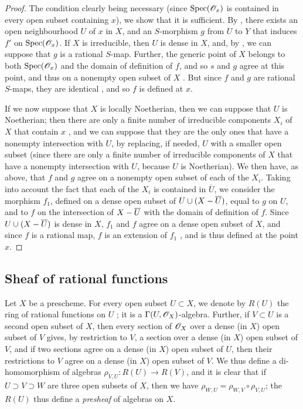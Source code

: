 \begin{proof}
\label{proof-1.7.2.9}
The condition clearly being necessary (since ${\mathop{\mathrm{Spec}}\nolimits}(\mathscr{O}_x)$ is contained in every open subset containing $x$), we show that it is sufficient.
By , there exists an open neighbourhood $U$ of $x$ in $X$, and an $S$-morphism $g$ from $U$ to $Y$ that induces $f'$ on ${\mathop{\mathrm{Spec}}\nolimits}(\mathscr{O}_x)$.
If $X$ is irreducible, then $U$ is dense in $X$, and, by , we can suppose that $g$ is a rational $S$-map.
Further, the generic point of $X$ belongs to both ${\mathop{\mathrm{Spec}}\nolimits}(\mathscr{O}_x)$ and the domain of definition of $f$, and so $s$ and $g$ agree at this point, and thus on a nonempty open subset of $X$ .
But since $f$ and $g$ are rational $S$-maps, they are identical , and so $f$ is defined at $x$.

If we now suppose that $X$ is locally Noetherian, then we can suppose that $U$ is Noetherian; then there are only a finite number of irreducible components $X_i$ of $X$ that contain $x$ , and we can suppose that they are the only ones that have a nonempty intersection with $U$, by replacing, if needed, $U$ with a smaller open subset (since there are only a finite number of irreducible components of $X$ that have a nonempty intersection with $U$, because $U$ is Noetherian).
We then have, as above, that $f$ and $g$ agree on a nonempty open subset of each of the $X_i$.
Taking into account the fact that each of the $X_i$ is contained in $\overline{U}$, we consider the morphism $f_1$, defined on a dense open subset of $U\cup(X-\overline{U})$, equal to $g$ on $U$, and to $f$ on the intersection of $X-\overline{U}$ with the domain of definition of $f$.
Since $U\cup(X-\overline{U})$ is dense in $X$, $f_1$ and $f$ agree on a dense open subset of $X$, and since $f$ is a rational map, $f$ is an extension of $f_1$ , and is thus defined at the point $x$.
\end{proof}

\subsection{Sheaf of rational functions}
\label{subsection:sheaf-of-rational-functions}

\begin{env}[7.3.1]
\label{1.7.3.1}
Let $X$ be a prescheme.
For every open subset $U\subset X$, we denote by $R(U)$ the ring of rational functions on $U$ ; it is a $\Gamma(U,\mathscr{O}_X)$-algebra.
Further, if $V\subset U$ is a second open subset of $X$, then every section of $\mathscr{O}_X$ over a dense (in $X$) open subset of $V$ gives, by restriction to $V$, a section over a dense (in $X$) open subset of $V$, and if two sections agree on a dense (in $X$) open subset of $U$, then their restrictions to $V$ agree on a dense (in $X$) open subset of $V$.
We thus define a di-homomorphism of algebras $\rho_{V,U}:R(U)\to R(V)$, and it is clear that if $U\supset V\supset W$ are three open subsets of $X$, then we have $\rho_{W,U}=\rho_{W,V}\circ\rho_{V,U}$; the $R(U)$ thus define a \emph{presheaf} of algebras on $X$.
\end{env}


